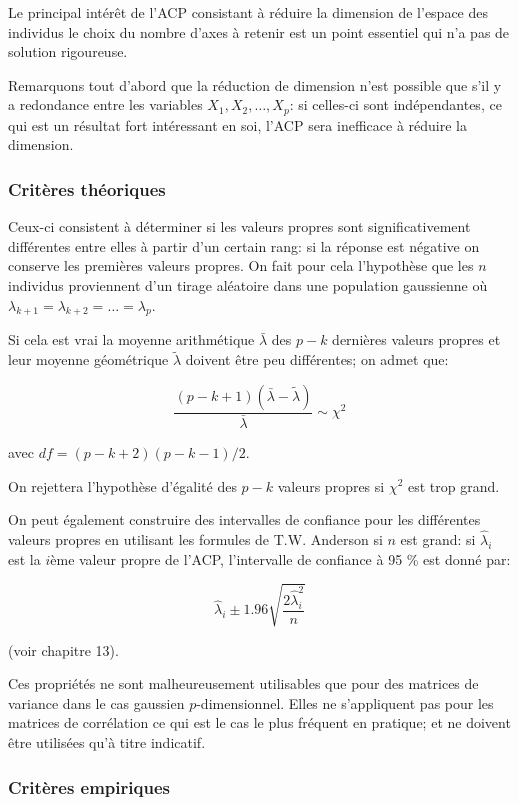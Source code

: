 \documentclass[12pt,a4paper]{article}
\begin{document}
Le principal intérêt de l'ACP consistant à réduire la dimension de l'espace des individus
le choix du nombre d'axes à retenir est un point essentiel qui n'a pas de solution rigoureuse.

Remarquons tout d'abord que la réduction de dimension n'est possible que s'il y a redondance entre les variables $X_1, X_2, \dots, X_p$: si celles-ci sont indépendantes, ce qui est un résultat fort intéressant en soi, l'ACP sera inefficace à réduire la dimension.

\subsubsection{Critères théoriques}

Ceux-ci consistent à déterminer si les valeurs propres sont significativement différentes
entre elles à partir d'un certain rang: si la réponse est négative on conserve les premières
valeurs propres. On fait pour cela l'hypothèse que les $n$ individus proviennent d'un tirage
aléatoire dans une population gaussienne où $\lambda_{k+1} = \lambda_{k+2} = \dots = \lambda_p$.

Si cela est vrai la moyenne arithmétique $\bar{\lambda}$ des $p-k$ dernières valeurs propres et leur moyenne géométrique $\tilde{\lambda}$ doivent être peu différentes; on admet que:

\[\frac{(p-k+1)(\bar{\lambda} - \tilde{\lambda})}{\bar{\lambda}} \sim \chi^2\]

avec $df = (p-k+2)(p-k-1)/2$.

On rejettera l'hypothèse d'égalité des $p-k$ valeurs propres si $\chi^2$ est trop grand.

On peut également construire des intervalles de confiance pour les différentes valeurs
propres en utilisant les formules de T.W. Anderson si $n$ est grand: si $\hat{\lambda}_i$ est la $i$ème valeur
propre de l'ACP, l'intervalle de confiance à 95 \% est donné par:

\[\hat{\lambda}_i \pm 1.96 \sqrt{\frac{2 \hat{\lambda}_i^2}{n}}\]

(voir chapitre 13).

Ces propriétés ne sont malheureusement utilisables que pour des matrices de variance
dans le cas gaussien $p$-dimensionnel. Elles ne s'appliquent pas pour les matrices de corrélation ce qui est le cas le plus fréquent en pratique; et ne doivent être utilisées qu'à titre
indicatif.

\subsubsection{Critères empiriques}
\end{document}
